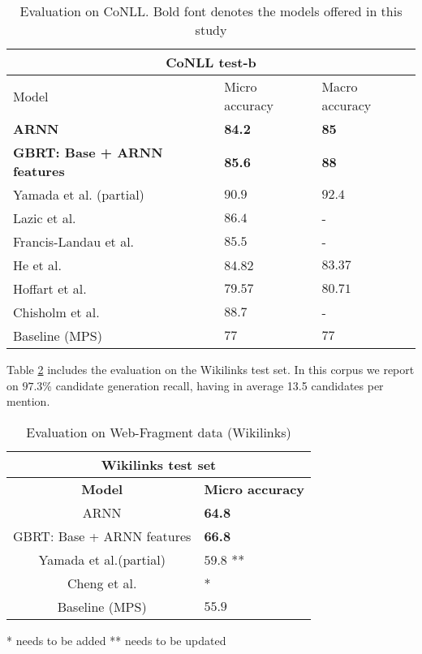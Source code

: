 \documentclass[11pt]{article}
\begin{document}
	
	\begin{table}[h]
		\begin{center}
			\begin{tabular}{|p{3.5cm}| p{1.5cm} p{1.5cm}|}
				\hline \multicolumn{3}{|c|}{CoNLL test-b} \\
				\hline Model & Micro     accuracy & Macro     accuracy \\ \hline
				\bf ARNN  & \bf 84.2 & \bf 85 \\
				\bf GBRT: Base + ARNN features & \bf 85.6 & \bf 88 \\
				Yamada et al. (partial) & $90.9$ & $92.4$ \\
				Lazic et al. & $86.4$ & - \\
				Francis-Landau et al. & $85.5$ & - \\
				He et al. & 84.82 & $83.37$ \\	
				Hoffart et al. & $79.57$ & $80.71$ \\
				Chisholm et al. & $88.7$ & - \\			
				Baseline (MPS) & $77$ & $77$ \\
				\hline
			\end{tabular}
		\end{center}
		\caption{\label{tab:a} Evaluation on CoNLL. Bold font denotes the models offered in this study}
	\end{table}

	Table \ref{tab:b} includes the evaluation on the Wikilinks test set. In this corpus we report on $97.3$\% candidate generation recall, having in average 13.5 candidates per mention.
	 
	\begin{table}[h]
	\begin{center}
		\begin{tabular}{|c| p{1.5cm}|}
			\hline \multicolumn{2}{|c|}{Wikilinks test set} \\
			\hline \bf Model & \bf Micro     accuracy  \\ \hline
			ARNN  &  \bf64.8\\
			GBRT: Base + ARNN features & \bf 66.8 \\
			Yamada et al.(partial) & $59.8$ ** \\
			Cheng et al. & * \\ 
			Baseline (MPS) & $55.9$ \\
			\hline
		\end{tabular}
	\end{center}
	\caption{\label{tab:b} Evaluation on Web-Fragment data (Wikilinks)}
	\end{table}
	* needs to be added \newline
	** needs to be updated \newline \newline
	
\end{document}
